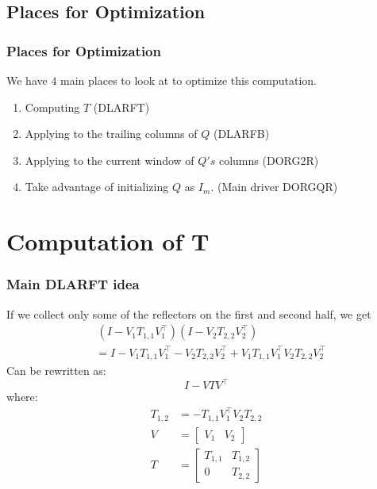 \documentclass[12pt,aspectratio=169]{beamer}
\begin{document}
    \subsection{Places for Optimization}
    \begin{frame}
        \frametitle{Places for Optimization}
        We have $4$ main places to look at to optimize this computation.
        \begin{enumerate}
            \item Computing $T$ (DLARFT)
            \item Applying to the trailing columns of $Q$ (DLARFB)
            \item Applying to the current window of $Q's$ columns (DORG2R)
            \item Take advantage of initializing $Q$ as $I_m$. (Main driver DORGQR)
        \end{enumerate}
    \end{frame}
    \section{Computation of T}
    \begin{frame}
        \frametitle{Main DLARFT idea}
        If we collect only some of the reflectors on the first and second half, we get
        \begin{align*}
            &\,(I - V_1T_{1,1}V_1^\top)(I - V_2T_{2,2}V_2^\top) \\
            &= I - V_1T_{1,1}V_1^\top - V_2T_{2,2}V_2^\top + V_1T_{1,1}V_1^\top V_2T_{2,2}V_2^\top
        \end{align*}
        Can be rewritten as:
        $$
            I - VTV^\top
        $$
        where:
        \begin{align*}
            T_{1,2} &= -T_{1,1}V_1^\top V_2T_{2,2} \\
            V &= \begin{bmatrix}
                V_1 & V_2
            \end{bmatrix}\\
            T &= \begin{bmatrix}
                T_{1,1} & T_{1,2} \\
                0       & T_{2,2}
            \end{bmatrix}
        \end{align*}
    \end{frame}
\end{document}
